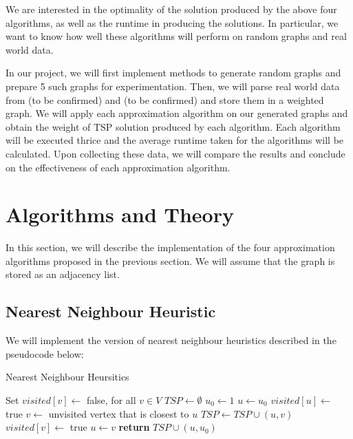 \documentclass[paper=a4, fontsize=11pt]{scrartcl}	%
\numberwithin{equation}{section}		%
\numberwithin{figure}{section}			%
\numberwithin{table}{section}				%
\begin{document}
We are interested in the optimality of the solution produced by the above four algorithms, as well as the runtime in producing the solutions. In particular, we want to know how well these algorithms will perform on random graphs and real world data. 

In our project, we will first implement methods to generate random graphs and prepare 5 such graphs for experimentation. Then, we will parse real world data from (to be confirmed) and (to be confirmed) and store them in a weighted graph. We will apply each approximation algorithm on our generated graphs and obtain the weight of TSP solution produced by each algorithm. Each algorithm will be executed thrice and the average runtime taken for the algorithms will be calculated. Upon collecting these data, we will compare the results and conclude on the effectiveness of each approximation algorithm.

\section{Algorithms and Theory}

In this section, we will describe the implementation of the four approximation algorithms proposed in the previous section. We will assume that the graph is stored as an adjacency list. 

\subsection{Nearest Neighbour Heuristic}

We will implement the version of nearest neighbour heuristics described in the pseudocode below:
\begin{algorithm}
\caption{Nearest Neighbour Heursitics}\label{neighbour}
\begin{algorithmic}[1]
   \State Set $visited[v]\gets$ false, for all $v\in V$
   \State $TSP\gets\emptyset$
   \State $u_{0}\gets 1$ 
   \State $u\gets u_{0}$
   \State $visited[u]\gets$ true
      \State $v\gets$ unvisited vertex that is closest to $u$
      \State $TSP\gets TSP\cup(u,v)$
      \State $visited[v]\gets$ true
      \State $u\gets v$
   \EndWhile\label{nearestneighbourwhile}
   \State \textbf{return} $TSP\cup(u,u_{0})$
\EndProcedure
\end{algorithmic}
\end{algorithm}
\end{document}
